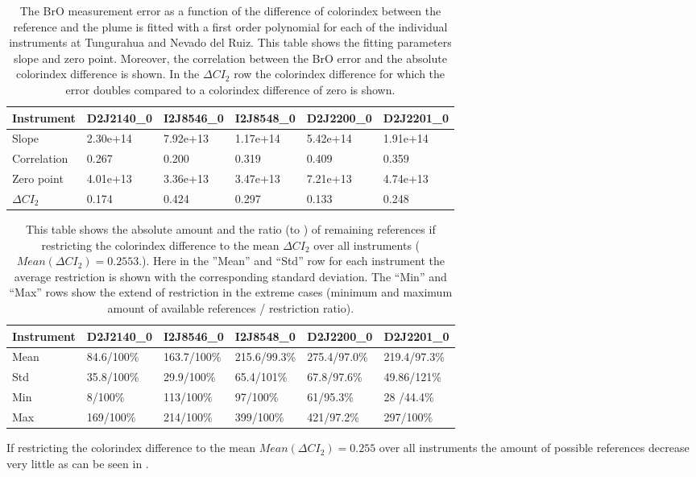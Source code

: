 	\begin{table}[h]
	\centering
	\begin{tabular}{|p{2cm}|p{2cm}|p{2cm}|p{2cm}|p{2cm}|p{2cm}|}
		Instrument	&D2J2140\_0&I2J8546\_0& I2J8548\_0&D2J2200\_0&D2J2201\_0\\
		\toprule
		Slope&2.30e+14 &7.92e+13 &1.17e+14 &5.42e+14&1.91e+14\\
		\midrule
		Correlation&
		0.267&
		0.200&
		0.319&
		0.409&
		0.359\\
		\midrule
		Zero point&4.01e+13&3.36e+13&3.47e+13& 7.21e+13& 4.74e+13\\
		\midrule
		$\Delta CI_{2}$&0.174&0.424&0.297&0.133&0.248\\
		\bottomrule
	\end{tabular}
	\caption{The BrO measurement error as a function of the difference of colorindex between the reference and the plume is fitted with a first order polynomial for each of the individual instruments at Tungurahua and Nevado del Ruiz. This table shows the fitting parameters slope and zero point. Moreover, the correlation between the BrO error and the absolute colorindex difference is shown. In the $\Delta CI_{2}$ row the colorindex difference for which the error doubles compared to a colorindex difference of zero is shown.}
	\label{tab:colidxcalc}
\end{table}

	\begin{table}[h]
	\centering
	\begin{tabular}{|p{1.8cm}|p{2.15cm}|p{2.15cm}|p{2.15cm}|p{2.15cm}|p{2.15cm}|}
		Instrument	&D2J2140\_0&I2J8546\_0& I2J8548\_0&D2J2200\_0&D2J2201\_0\\
		\toprule
		Mean&
		84.6/100\% &	163.7/100\%&	215.6/99.3\%&
		275.4/97.0\% &219.4/97.3\% \\
		\midrule
		Std&
		35.8/100\% &	29.9/100\% &
		65.4/101\%&
		67.8/97.6\% &
		49.86/121\% \\
		\midrule
		Min&
		8/100\% &
		113/100\% 
		&97/100\% 
		&61/95.3\% 
		&28	/44.4\% \\
		\midrule
		Max
		&169/100\% 
		&214/100\% 
		&399/100\% 
		&421/97.2\% 
		&297/100\%  \\
		\bottomrule
	\end{tabular}
	\caption{This table shows the absolute amount and the ratio  (to ) of remaining references if restricting the colorindex difference to the mean $\Delta CI_{2}$ over all instruments ($Mean(\Delta CI_{2}) = 0.2553.$). Here in the ”Mean” and “Std” row for each  instrument the average restriction is shown with the corresponding standard deviation. The “Min” and “Max” rows show the extend of restriction in the extreme cases (minimum and maximum amount of available references / restriction ratio).}
	\label{tab:colidxres}
\end{table}	
If restricting the colorindex difference to the mean $Mean(\Delta CI_{2}) = 0.255$ over all instruments the amount of possible references decrease very little as can be seen in .\\

